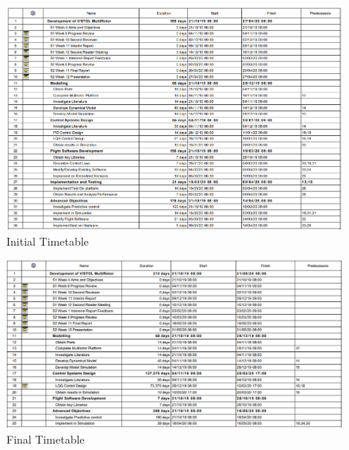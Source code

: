 \documentclass[12pt,a4paper,twoside]{report}
\begin{document}
			\begin{figure}[h!]
				\centering
				\includegraphics[width=1\linewidth]{ProjectInitialTimetable.png}
				\caption{Initial Timetable}
				\label{fig:initialtimetable}
			\end{figure}
		
			\begin{figure}[h!]
				\centering
				\includegraphics[width=1\linewidth]{ProjectFinalTimetable.png}
				\caption{Final Timetable}
				\label{fig:finaltimetable}
			\end{figure}
		
\end{document}
